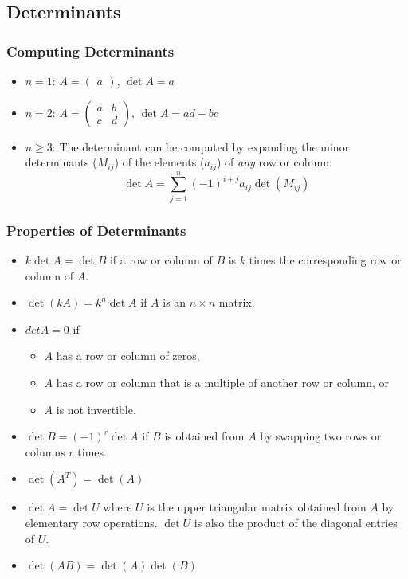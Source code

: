 \subsection{Determinants}

\subsubsection{Computing Determinants}

\begin{itemize}
    \item $n = 1$: $A = \begin{pmatrix}
                  a
              \end{pmatrix}$, $\det A = a$
    \item $n = 2$: $A = \begin{pmatrix}
                  a & b \\
                  c & d
              \end{pmatrix}$, $\det A = ad - bc$
    \item $n \ge 3$: The determinant can be computed by expanding the minor determinants ($M_{ij}$) of the elements ($a_{ij}$) of \emph{any} row or column:
          \begin{equation*}
              \det A = \sum_{j=1}^n (-1)^{i+j} a_{ij} \det(M_{ij})
          \end{equation*}
\end{itemize}

\subsubsection{Properties of Determinants}

\begin{itemize}
    \item $k\det A = \det B$ if a row or column of $B$ is $k$ times the corresponding row or column of $A$.
    \item $\det(kA) = k^n \det A$ if $A$ is an $n \times n$ matrix.
    \item $det A = 0$ if
          \begin{itemize}
              \item $A$ has a row or column of zeros,
              \item $A$ has a row or column that is a multiple of another row or column, or
              \item $A$ is not invertible.
          \end{itemize}
    \item $\det B = (-1)^r \det A$ if $B$ is obtained from $A$ by swapping two rows or columns $r$ times.
    \item $\det(A^T) = \det(A)$
    \item $\det A = \det U$ where $U$ is the upper triangular matrix obtained from $A$ by elementary row operations. $\det U$ is also the product of the diagonal entries of $U$.
    \item $\det(AB) = \det(A)\det(B)$
\end{itemize}


